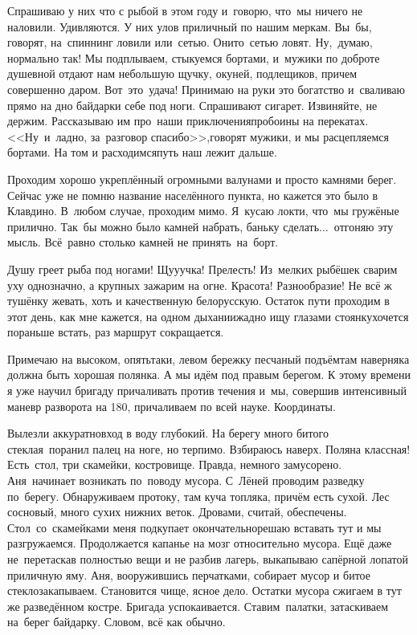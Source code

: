 Спрашиваю у них что с рыбой в этом году и~говорю, что~мы ничего не наловили. Удивляются. У них улов приличный по нашим меркам. Вы~бы, говорят, на~спиннинг ловили или~сетью. Они\sdash то~сетью ловят. Ну,~думаю, нормально так! Мы подплываем, стыкуемся бортами, и~мужики по доброте душевной отдают нам небольшую щучку, окуней, подлещиков, причем совершенно даром. Вот~это~удача! Принимаю на руки это богатство и~сваливаю прямо на дно байдарки себе под ноги. Спрашивают сигарет. Извиняйте, не держим. Рассказываю им про~наши приключения\mdash пробоины на перекатах. <<Ну~и~ладно, за~разговор спасибо>>,\mdash говорят мужики, и мы расцепляемся бортами. На том и расходимся\mdash путь наш лежит дальше.

Проходим хорошо укреплённый огромными валунами и просто камнями берег. Сейчас уже не помню название населённого пункта, но кажется это было в Клавдино. В~любом случае, проходим мимо. Я~кусаю локти, что~мы гружёные прилично. Так~бы можно было камней набрать, баньку сделать$\ldots$~отгоняю эту мысль. Всё~равно столько камней не принять~на~борт.

Душу греет рыба под ногами! Щу\sdash у\sdash учка! Прелесть! Из~мелких рыбёшек сварим уху однозначно, а крупных зажарим на огне. Красота! Разнообразие! Не всё ж тушёнку жевать, хоть и качественную белорусскую. Остаток пути проходим в этот день, как мне кажется, на одном дыхании\mdash жадно ищу глазами стоянку\mdash хочется пораньше встать, раз маршрут сокращается. 

Примечаю на высоком, опять\sdash таки, левом бережку песчаный подъём\mdash там наверняка должна быть хорошая полянка. А мы идём под правым берегом. К этому времени я уже научил бригаду причаливать против течения и~мы, совершив интенсивный маневр разворота на 180\degree, причаливаем по всей науке. Координаты. 

Вылезли аккуратно\mdash вход в воду глубокий. На берегу много битого стекла\mdash я~поранил палец на ноге, но терпимо. Взбираюсь наверх. Поляна классная! Есть~стол, три скамейки, костровище. Правда, немного замусорено. Аня~начинает возникать по~поводу мусора. С~Лёней проводим разведку по~берегу. Обнаруживаем протоку, там куча топляка, причём есть сухой. Лес сосновый, много сухих нижних веток. Дровами, считай, обеспечены. Стол~со~скамейками меня подкупает окончательно\mdash решаю вставать тут и мы разгружаемся. Продолжается капанье на мозг относительно мусора. Ещё даже не~перетаскав полностью вещи и не разбив лагерь, выкапываю сапёрной лопатой приличную яму. Аня, вооружившись перчатками, собирает мусор и битое стекло\mdash закапываем. Становится чище, ясное дело. Остатки мусора сжигаем в тут же разведённом костре. Бригада успокаивается. Ставим~палатки, затаскиваем на~берег байдарку. Словом, всё как обычно. 


